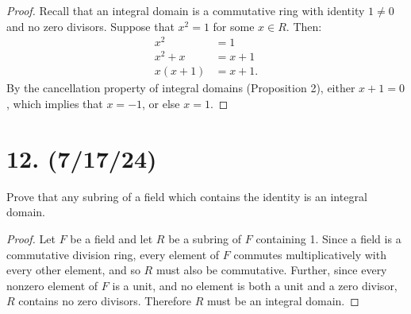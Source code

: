 \documentclass{article}
\begin{document}
\begin{proof}
    Recall that an integral domain is a commutative ring with identity $1 \neq 0$ and no zero divisors. Suppose that $x^2 = 1$ for some $x \in R$. Then:
    \begin{align*}
        x^2 &= 1 \\
        x^2 + x &= x + 1 \\
        x(x + 1) &= x + 1.
    \end{align*}
    By the cancellation property of integral domains (Proposition 2), either $x + 1 = 0$, which implies that $x = -1$, or else $x = 1$.
\end{proof}

\section*{12. (7/17/24)}

Prove that any subring of a field which contains the identity is an integral domain.

\begin{proof}
    Let $F$ be a field and let $R$ be a subring of $F$ containing 1. Since a field is a commutative division ring, every element of $F$ commutes multiplicatively with every other element, and so $R$ must also be commutative. Further, since every nonzero element of $F$ is a unit, and no element is both a unit and a zero divisor, $R$ contains no zero divisors. Therefore $R$ must be an integral domain.
\end{proof}
\end{document}
